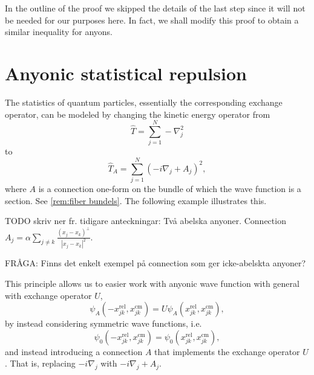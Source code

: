 In the outline of the proof we skipped the details of the last step since it will not be needed for our purposes here. In fact, we shall modify this proof to obtain a similar inequality for anyons.




\section{Anyonic statistical repulsion}

The statistics of quantum particles, essentially the corresponding exchange operator, can be modeled by changing the kinetic energy operator from
\begin{equation}
 \widehat{T} = \sum_{j=1}^N -\nabla_j^2
\end{equation}
to
\begin{equation}
 \widehat{T}_A = \sum_{j=1}^N \left( -i \nabla_j + A_j \right)^2,
\end{equation}
where $A$ is a connection one-form on the bundle of which the wave function is a section. See \cref{rem:fiber bundels}. The following example illustrates this.

\begin{example}
  TODO skriv ner fr. tidigare anteckningar: Två abelska anyoner. Connection $A_j = \alpha \sum_{j \ne k} \frac{(x_j - x_k)^\perp}{|x_j-x_k|^2}$.
\end{example}

FRÅGA: Finns det enkelt exempel på connection som ger icke-abelskta anyoner?

This principle allows us to easier work with anyonic wave function with general with exchange operator $U$,
\begin{equation}
  \psi_A(-x_{jk}^\text{rel}, x_{jk}^\text{cm}) = U \psi_A(x_{jk}^\text{rel}, x_{jk}^\text{cm}),
\end{equation}
by instead considering symmetric wave functions, i.e.\
\begin{equation}
  \psi_0(-x_{jk}^\text{rel}, x_{jk}^\text{cm}) = \psi_0(x_{jk}^\text{rel}, x_{jk}^\text{cm}),
\end{equation}
and instead introducing a connection $A$ that implements the exchange operator $U$. That is, replacing $-i\nabla_j$ with $-i\nabla_j+A_j$.



